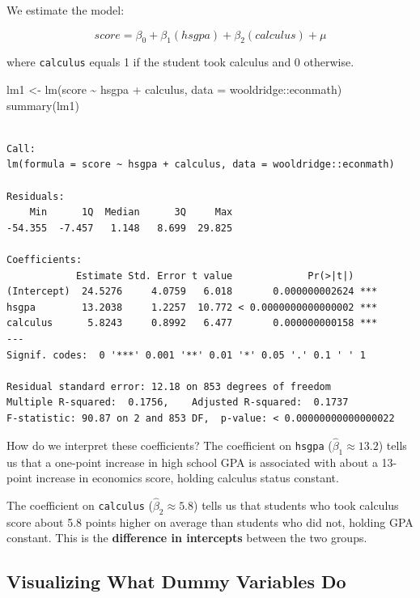 \documentclass[
  letterpaper,
  DIV=11,
  numbers=noendperiod]{scrreprt}
\newenvironment{Shaded}{\begin{snugshade}}{\end{snugshade}}
\newcommand{\AttributeTok}[1]{\textcolor[rgb]{0.40,0.45,0.13}{#1}}
\newcommand{\FunctionTok}[1]{\textcolor[rgb]{0.28,0.35,0.67}{#1}}
\newcommand{\NormalTok}[1]{\textcolor[rgb]{0.00,0.23,0.31}{#1}}
\newcommand{\OtherTok}[1]{\textcolor[rgb]{0.00,0.23,0.31}{#1}}
\newcommand{\SpecialCharTok}[1]{\textcolor[rgb]{0.37,0.37,0.37}{#1}}
\begin{document}
We estimate the model:

\[
score = \beta_0 + \beta_1(hsgpa) + \beta_2(calculus) + \mu
\]

where \texttt{calculus} equals 1 if the student took calculus and 0
otherwise.

\begin{Shaded}
\begin{Highlighting}[]
\NormalTok{lm1 }\OtherTok{\textless{}{-}} \FunctionTok{lm}\NormalTok{(score }\SpecialCharTok{\textasciitilde{}}\NormalTok{ hsgpa }\SpecialCharTok{+}\NormalTok{ calculus, }\AttributeTok{data =}\NormalTok{ wooldridge}\SpecialCharTok{::}\NormalTok{econmath)}
\FunctionTok{summary}\NormalTok{(lm1)}
\end{Highlighting}
\end{Shaded}

\begin{verbatim}

Call:
lm(formula = score ~ hsgpa + calculus, data = wooldridge::econmath)

Residuals:
    Min      1Q  Median      3Q     Max 
-54.355  -7.457   1.148   8.699  29.825 

Coefficients:
            Estimate Std. Error t value             Pr(>|t|)    
(Intercept)  24.5276     4.0759   6.018       0.000000002624 ***
hsgpa        13.2038     1.2257  10.772 < 0.0000000000000002 ***
calculus      5.8243     0.8992   6.477       0.000000000158 ***
---
Signif. codes:  0 '***' 0.001 '**' 0.01 '*' 0.05 '.' 0.1 ' ' 1

Residual standard error: 12.18 on 853 degrees of freedom
Multiple R-squared:  0.1756,    Adjusted R-squared:  0.1737 
F-statistic: 90.87 on 2 and 853 DF,  p-value: < 0.00000000000000022
\end{verbatim}

How do we interpret these coefficients? The coefficient on
\texttt{hsgpa} (\(\hat{\beta}_1 \approx 13.2\)) tells us that a
one-point increase in high school GPA is associated with about a
13-point increase in economics score, holding calculus status constant.

The coefficient on \texttt{calculus} (\(\hat{\beta}_2 \approx 5.8\))
tells us that students who took calculus score about 5.8 points higher
on average than students who did not, holding GPA constant. This is the
\textbf{difference in intercepts} between the two groups.

\subsection{Visualizing What Dummy Variables
Do}\label{visualizing-what-dummy-variables-do}
\end{document}
